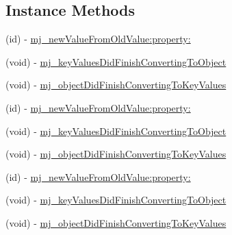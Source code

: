 \subsection*{Instance Methods}
\begin{DoxyCompactItemize}
\item 
(id) -\/ \mbox{\hyperlink{protocol_m_j_key_value_01-p_a6a4f763701529e800607aad6d51f680a}{mj\+\_\+new\+Value\+From\+Old\+Value\+:property\+:}}
\item 
(void) -\/ \mbox{\hyperlink{protocol_m_j_key_value_01-p_aee8995f1a20da182be7e4b1b7160506f}{mj\+\_\+key\+Values\+Did\+Finish\+Converting\+To\+Object}}
\item 
(void) -\/ \mbox{\hyperlink{protocol_m_j_key_value_01-p_a9a84752f78d1e07dcb0cbb4be2167ac2}{mj\+\_\+object\+Did\+Finish\+Converting\+To\+Key\+Values}}
\item 
(id) -\/ \mbox{\hyperlink{protocol_m_j_key_value_01-p_a6a4f763701529e800607aad6d51f680a}{mj\+\_\+new\+Value\+From\+Old\+Value\+:property\+:}}
\item 
(void) -\/ \mbox{\hyperlink{protocol_m_j_key_value_01-p_aee8995f1a20da182be7e4b1b7160506f}{mj\+\_\+key\+Values\+Did\+Finish\+Converting\+To\+Object}}
\item 
(void) -\/ \mbox{\hyperlink{protocol_m_j_key_value_01-p_a9a84752f78d1e07dcb0cbb4be2167ac2}{mj\+\_\+object\+Did\+Finish\+Converting\+To\+Key\+Values}}
\item 
(id) -\/ \mbox{\hyperlink{protocol_m_j_key_value_01-p_a6a4f763701529e800607aad6d51f680a}{mj\+\_\+new\+Value\+From\+Old\+Value\+:property\+:}}
\item 
(void) -\/ \mbox{\hyperlink{protocol_m_j_key_value_01-p_aee8995f1a20da182be7e4b1b7160506f}{mj\+\_\+key\+Values\+Did\+Finish\+Converting\+To\+Object}}
\item 
(void) -\/ \mbox{\hyperlink{protocol_m_j_key_value_01-p_a9a84752f78d1e07dcb0cbb4be2167ac2}{mj\+\_\+object\+Did\+Finish\+Converting\+To\+Key\+Values}}
\end{DoxyCompactItemize}
